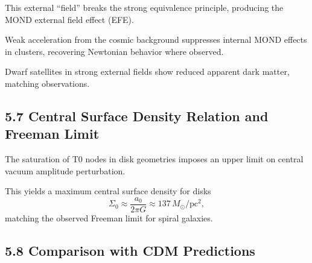 	This external ``field'' breaks the strong equivalence principle, producing the MOND external field effect (EFE).
	
	Weak acceleration from the cosmic background suppresses internal MOND effects in clusters, recovering Newtonian behavior where observed.
	
	Dwarf satellites in strong external fields show reduced apparent dark matter, matching observations.
	
	\subsection{5.7 Central Surface Density Relation and Freeman Limit}
	
	The saturation of T0 nodes in disk geometries imposes an upper limit on central vacuum amplitude perturbation.
	
	This yields a maximum central surface density for disks
	\[
	\Sigma_0 \approx \frac{a_0}{2\pi G} \approx 137 \, M_\odot / \text{pc}^2,
	\]
	matching the observed Freeman limit for spiral galaxies.
	
	\subsection{5.8 Comparison with CDM Predictions}
	
	\begin{table}[htbp]
		\centering
		\caption{Galactic scale predictions}
		\label{tab:galactic}
	\end{table}
	
